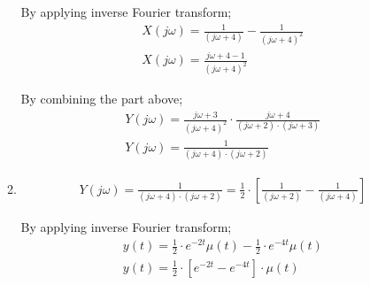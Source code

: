 \documentclass[10pt,a4paper, margin=1in]{article}
\begin{document}
\begin{enumerate}
\begin{enumerate}
    By applying inverse Fourier transform;
    \begin{align*}
        X(j\omega) = \frac{1}{(j\omega + 4)} - \frac{1}{(j\omega + 4)^2} \\
        X(j\omega) = \frac{j\omega + 4 - 1}{(j\omega + 4)^2}
    \end{align*}
    
    By combining the part above;
    \begin{align*}
        Y(j\omega) = \frac{j\omega + 3}{(j\omega + 4)^2} \cdot \frac{j\omega + 4}{(j\omega + 2) \cdot (j\omega + 3)} \\
        Y(j\omega) = \frac{1}{(j\omega + 4) \cdot (j\omega + 2)}
    \end{align*}
    
    
    
    \item %
    \begin{align*}
        Y(j\omega) = \frac{1}{(j\omega + 4) \cdot (j\omega + 2)} = \frac{1}{2} \cdot [\frac{1}{(j\omega + 2)} - \frac{1}{(j\omega + 4)}]
    \end{align*}
    
    By applying inverse Fourier transform;
    \begin{align*}
        y(t) = \frac{1}{2} \cdot e^{-2t} \mu(t) - \frac{1}{2} \cdot e^{-4t} \mu(t) \\
        y(t) = \frac{1}{2} \cdot [e^{-2t} - e^{-4t}] \cdot \mu(t)
    \end{align*}
    
    \end{enumerate}


\end{enumerate}
\end{document}

